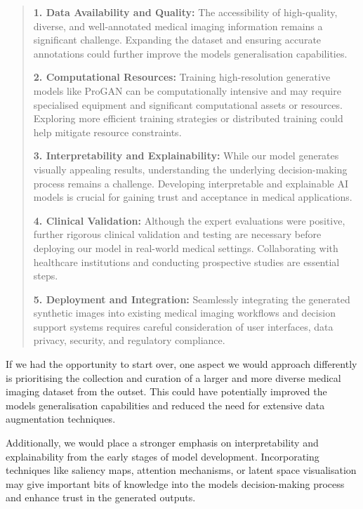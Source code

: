 \documentclass[
]{article}
\begin{document}
\begin{quote}
\textbf{1. Data Availability and Quality:} The accessibility of
high-quality, diverse, and well-annotated medical imaging information
remains a significant challenge. Expanding the dataset and ensuring
accurate annotations could further improve the model\textquotesingle s
generalisation capabilities.

\textbf{2. Computational Resources:} Training high-resolution generative
models like ProGAN can be computationally intensive and may require
specialised equipment and significant computational assets or resources.
Exploring more efficient training strategies or distributed training
could help mitigate resource constraints.

\textbf{3. Interpretability and Explainability:} While our model
generates visually appealing results, understanding the underlying
decision-making process remains a challenge. Developing interpretable
and explainable AI models is crucial for gaining trust and acceptance in
medical applications.

\textbf{4. Clinical Validation:} Although the expert evaluations were
positive, further rigorous clinical validation and testing are necessary
before deploying our model in real-world medical settings. Collaborating
with healthcare institutions and conducting prospective studies are
essential steps.

\textbf{5. Deployment and Integration:} Seamlessly integrating the
generated synthetic images into existing medical imaging workflows and
decision support systems requires careful consideration of user
interfaces, data privacy, security, and regulatory compliance.
\end{quote}

If we had the opportunity to start over, one aspect we would approach
differently is prioritising the collection and curation of a larger and
more diverse medical imaging dataset from the outset. This could have
potentially improved the model\textquotesingle s generalisation
capabilities and reduced the need for extensive data augmentation
techniques.

Additionally, we would place a stronger emphasis on interpretability and
explainability from the early stages of model development. Incorporating
techniques like saliency maps, attention mechanisms, or latent space
visualisation may give important bits of knowledge into the
model\textquotesingle s decision-making process and enhance trust in the
generated outputs.
\end{document}
